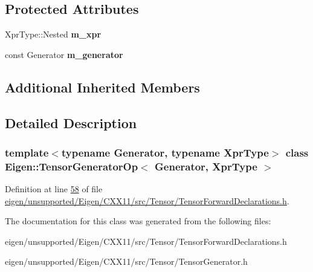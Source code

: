 \subsection*{Protected Attributes}
\begin{DoxyCompactItemize}
\item 
\mbox{\label{class_eigen_1_1_tensor_generator_op_aee6ee461d07aa5b925f7720c06e002b6}} 
Xpr\+Type\+::\+Nested {\bfseries m\+\_\+xpr}
\item 
\mbox{\label{class_eigen_1_1_tensor_generator_op_aabbbc9f77ca9ce98b8a9b7f8f9c8791c}} 
const Generator {\bfseries m\+\_\+generator}
\end{DoxyCompactItemize}
\subsection*{Additional Inherited Members}


\subsection{Detailed Description}
\subsubsection*{template$<$typename Generator, typename Xpr\+Type$>$\newline
class Eigen\+::\+Tensor\+Generator\+Op$<$ Generator, Xpr\+Type $>$}



Definition at line \hyperlink{eigen_2unsupported_2_eigen_2_c_x_x11_2src_2_tensor_2_tensor_forward_declarations_8h_source_l00058}{58} of file \hyperlink{eigen_2unsupported_2_eigen_2_c_x_x11_2src_2_tensor_2_tensor_forward_declarations_8h_source}{eigen/unsupported/\+Eigen/\+C\+X\+X11/src/\+Tensor/\+Tensor\+Forward\+Declarations.\+h}.



The documentation for this class was generated from the following files\+:\begin{DoxyCompactItemize}
\item 
eigen/unsupported/\+Eigen/\+C\+X\+X11/src/\+Tensor/\+Tensor\+Forward\+Declarations.\+h\item 
eigen/unsupported/\+Eigen/\+C\+X\+X11/src/\+Tensor/\+Tensor\+Generator.\+h\end{DoxyCompactItemize}
